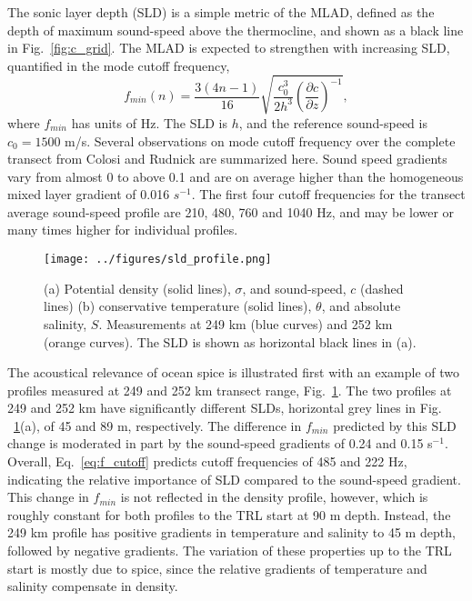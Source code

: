 \documentclass[preprint,NumberedRefs]{JASA}
\begin{document}
The sonic layer depth (SLD) is a simple metric of the MLAD, defined as the depth of maximum sound-speed above the thermocline, and shown as a black line in Fig.~\ref{fig:c_grid}. The MLAD is expected to strengthen with increasing SLD, quantified in the mode cutoff frequency\citep{Urick1982Prop},
\begin{equation}
    f_{min}(n) = \frac{3(4n-1)}{16} \sqrt{\frac{c_0^3}{2h^3} \left( \frac{\partial c}{\partial z} \right) ^ {-1}},
    \label{eq:f_cutoff}
\end{equation}
where $f_{min}$ has units of Hz. The SLD is $h$, and the reference sound-speed is $c_0 = 1500$ m/s. Several observations on mode cutoff frequency over the complete transect from Colosi and Rudnick\cite{colosi2020observations} are summarized here. Sound speed gradients vary from almost 0 to above 0.1 and are on average higher than the homogeneous mixed layer gradient of 0.016 $s^{-1}$. The first four cutoff frequencies for the transect average sound-speed profile are 210, 480, 760 and 1040 Hz, and may be lower or many times higher for individual profiles.

\begin{figure}
    \texttt{[image: ../figures/sld\_profile.png]}
    \caption{\label{fig:profiles}{(a) Potential density (solid lines), $\sigma$, and sound-speed, $c$ (dashed lines) (b) conservative temperature (solid lines), $\theta$, and absolute salinity, $S$. Measurements at 249 km (blue curves) and 252 km (orange curves). The SLD is shown as horizontal black lines in (a).}}
\end{figure}

The acoustical relevance of ocean spice is illustrated first with an example of two profiles measured at 249 and 252 km transect range, Fig.~\ref{fig:profiles}. The two profiles at 249 and 252 km have significantly different SLDs, horizontal grey lines in Fig. ~\ref{fig:profiles}(a), of 45 and 89 m, respectively. The difference in $f_{min}$ predicted by this SLD change is moderated in part by the sound-speed gradients of 0.24 and 0.15 s$^{-1}$. Overall, Eq.~\eqref{eq:f_cutoff} predicts cutoff frequencies of 485 and 222 Hz, indicating the relative importance of SLD compared to the sound-speed gradient. This change in $f_{min}$ is not reflected in the density profile, however, which is roughly constant for both profiles to the TRL start at 90 m depth. Instead, the 249 km profile has positive gradients in temperature and salinity to 45 m depth, followed by negative gradients. The variation of these properties up to the TRL start is mostly due to spice, since the relative gradients of temperature and salinity compensate in density.
\end{document}
